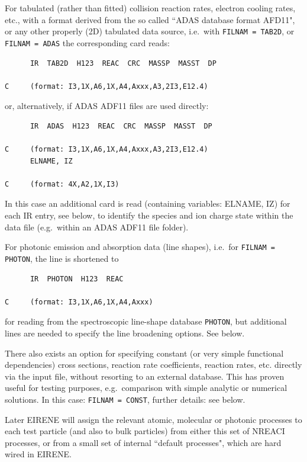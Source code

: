 For tabulated (rather than fitted) collision reaction rates, electron cooling
rates, etc., with a format derived from the so called ``\ac{ADAS} database
format AFD11", or any other properly (2D) tabulated data source, i.e.\ with
\lstinline|FILNAM = TAB2D|, or \lstinline|FILNAM = ADAS| the corresponding card reads:

\begin{lstlisting}
      IR  TAB2D  H123  REAC  CRC  MASSP  MASST  DP

C     (format: I3,1X,A6,1X,A4,Axxx,A3,2I3,E12.4)
\end{lstlisting}

or, alternatively, if \ac{ADAS}
ADF11 files are used directly:

\begin{lstlisting}
      IR  ADAS  H123  REAC  CRC  MASSP  MASST  DP

C     (format: I3,1X,A6,1X,A4,Axxx,A3,2I3,E12.4)
      ELNAME, IZ

C     (format: 4X,A2,1X,I3)
\end{lstlisting}

In this case an additional card is read (containing variables: ELNAME, IZ) for
each IR entry, see below, to identify the species and ion charge state within
the data file (e.g.\ within an \ac{ADAS} ADF11 file folder).

For photonic emission and absorption data (line shapes), i.e.\ for
\lstinline|FILNAM = PHOTON|, the line is shortened to 

\begin{lstlisting}
      IR  PHOTON  H123  REAC

C     (format: I3,1X,A6,1X,A4,Axxx)
\end{lstlisting} 

for reading from the spectroscopic line-shape database \lstinline|PHOTON|,
but additional lines are needed to specify the line broadening options.
See below.

There also exists an option for specifying constant (or very simple functional
dependencies) cross sections, reaction rate coefficients, reaction rates, etc.
directly via the input file, without resorting to an external database.
This has proven useful for testing purposes, e.g.\ comparison with simple
analytic or numerical solutions.
In this case: \lstinline|FILNAM = CONST|, further details: see below.

Later EIRENE will assign the relevant atomic, molecular or photonic processes
to each test particle (and also to bulk particles) from either this set of
NREACI processes, or from a small set of internal ``default processes", which
are hard wired in EIRENE.

